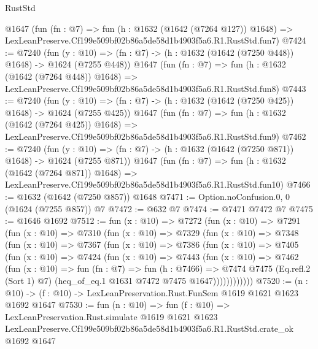 \begin{lexlean}{RustStd}
\begin{coremodule}
    @1647
    (fun (fn : @7) =>
    fun (h : @1632 (@1642 (@7264 @127)) @1648) =>
    LexLeanPreserve.Cf199e509bf02b86a5de58d1b4903f5a6.R1.RustStd.fun7)
@7424 := @7240
    (fun (y : @10) => (fn : @7) -> (h : @1632 (@1642 (@7250 @448)) @1648) -> @1624 (@7255 @448))
    @1647
    (fun (fn : @7) =>
    fun (h : @1632 (@1642 (@7264 @448)) @1648) =>
    LexLeanPreserve.Cf199e509bf02b86a5de58d1b4903f5a6.R1.RustStd.fun8)
@7443 := @7240
    (fun (y : @10) => (fn : @7) -> (h : @1632 (@1642 (@7250 @425)) @1648) -> @1624 (@7255 @425))
    @1647
    (fun (fn : @7) =>
    fun (h : @1632 (@1642 (@7264 @425)) @1648) =>
    LexLeanPreserve.Cf199e509bf02b86a5de58d1b4903f5a6.R1.RustStd.fun9)
@7462 := @7240
    (fun (y : @10) => (fn : @7) -> (h : @1632 (@1642 (@7250 @871)) @1648) -> @1624 (@7255 @871))
    @1647
    (fun (fn : @7) =>
    fun (h : @1632 (@1642 (@7264 @871)) @1648) =>
    LexLeanPreserve.Cf199e509bf02b86a5de58d1b4903f5a6.R1.RustStd.fun10)
@7466 := @1632 (@1642 (@7250 @857)) @1648
@7471 := Option.noConfusion.{0, 0} (@1624 (@7255 @857)) @7
@7472 := @632 @7
@7474 := @7471 @7472 @7
@7475 := @1646 @1692
@7512 := fun (x : @10) =>
  @7272
    (fun (x : @10) =>
    @7291
      (fun (x : @10) =>
      @7310
        (fun (x : @10) =>
        @7329
          (fun (x : @10) =>
          @7348
            (fun (x : @10) =>
            @7367
              (fun (x : @10) =>
              @7386
                (fun (x : @10) =>
                @7405
                  (fun (x : @10) =>
                  @7424
                    (fun (x : @10) =>
                    @7443
                      (fun (x : @10) =>
                      @7462
                        (fun (x : @10) =>
                        fun (fn : @7) =>
                        fun (h : @7466) =>
                        @7474
                          @7475
                          (Eq.refl.{2} (Sort 1) @7)
                          (heq_of_eq.{1} @1631 @7472 @7475 @1647))))))))))))
@7520 := (n : @10) -> (f : @10) -> LexLeanPreservation.Rust.FunSem @1619 @1621 @1623 @1692 @1647
@7530 := fun (n : @10) =>
  fun (f : @10) =>
  LexLeanPreservation.Rust.simulate
    @1619
    @1621
    @1623
    LexLeanPreserve.Cf199e509bf02b86a5de58d1b4903f5a6.R1.RustStd.crate_ok
    @1692
    @1647
\end{coremodule}
\end{lexlean}
